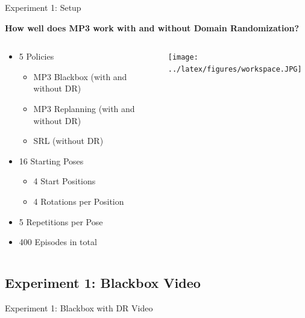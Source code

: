\documentclass[16:9,en,navbarinfooter]{sdqbeamer}
\begin{document}
\begin{frame}{Experiment 1: Setup}

	\begin{center}
		\vspace{1cm}
		\textbf{How well does MP3 work with and without Domain Randomization?}
	\end{center}

	\begin{columns}[t]
		\begin{column}{0.5\textwidth}
			\vspace{.1cm}
			\begin{itemize}
				\item 5 Policies
				      \begin{itemize}
					      \item MP3 Blackbox (with and without DR)
					      \item MP3 Replanning (with and without DR)
					      \item SRL (without DR)
				      \end{itemize}
				\item 16 Starting Poses
				      \begin{itemize}
					      \item 4 Start Positions
					      \item 4 Rotations per Position
				      \end{itemize}
				\item 5 Repetitions per Pose
				\item 400 Episodes in total
			\end{itemize}
		\end{column}
		\begin{column}{0.5\textwidth}
			\vspace{.1cm}
			\texttt{[image: ../latex/figures/workspace.JPG]}
		\end{column}


	\end{columns}
\end{frame}

\subsection{Experiment 1: Blackbox Video}
\begin{frame}{Experiment 1: Blackbox with DR Video}
	\begin{columns}[t]
		\vspace{1cm}

	\end{columns}
\end{frame}
\end{document}
